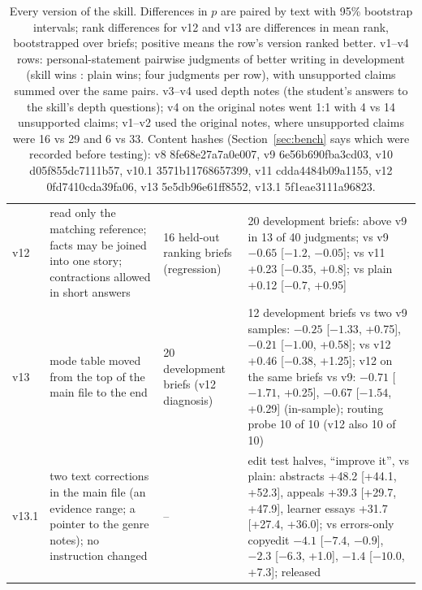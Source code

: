 \documentclass[11pt]{article}
\begin{document}
\begin{table}[t]
\begin{tabular}{lp{4.6cm}p{2.9cm}p{6.4cm}}
v12 & read only the matching reference; facts may be joined into one story; contractions allowed in short answers & 16 held-out ranking briefs (regression) & 20 development briefs: above v9 in 13 of 40 judgments; vs v9 $-0.65$ [$-1.2$, $-0.05$]; vs v11 +0.23 [$-0.35$, +0.8]; vs plain +0.12 [$-0.7$, +0.95] \\
v13 & mode table moved from the top of the main file to the end & 20 development briefs (v12 diagnosis) & 12 development briefs vs two v9 samples: $-0.25$ [$-1.33$, +0.75], $-0.21$ [$-1.00$, +0.58]; vs v12 +0.46 [$-0.38$, +1.25]; v12 on the same briefs vs v9: $-0.71$ [$-1.71$, +0.25], $-0.67$ [$-1.54$, +0.29] (in-sample); routing probe 10 of 10 (v12 also 10 of 10) \\
v13.1 & two text corrections in the main file (an evidence range; a pointer to the genre notes); no instruction changed & -- & edit test halves, ``improve it'', vs plain: abstracts +48.2 [+44.1, +52.3], appeals +39.3 [+29.7, +47.9], learner essays +31.7 [+27.4, +36.0]; vs errors-only copyedit $-4.1$ [$-7.4$, $-0.9$], $-2.3$ [$-6.3$, +1.0], $-1.4$ [$-10.0$, +7.3]; released \\
\bottomrule
\end{tabular}
\caption{Every version of the skill. Differences in $p$ are paired by text with 95\% bootstrap intervals; rank differences for v12 and v13 are differences in mean rank, bootstrapped over briefs; positive means the row's version ranked better. v1--v4 rows: personal-statement pairwise judgments of better writing in development (skill wins : plain wins; four judgments per row), with unsupported claims summed over the same pairs. v3--v4 used depth notes (the student's answers to the skill's depth questions); v4 on the original notes went 1:1 with 4 vs 14 unsupported claims; v1--v2 used the original notes, where unsupported claims were 16 vs 29 and 6 vs 33. Content hashes (Section~\ref{sec:bench} says which were recorded before testing): v8 8fe68e27a7a0e007, v9 6e56b690fba3cd03, v10 d05f855dc7111b57, v10.1 3571b11768657399, v11 cdda4484b09a1155, v12 0fd7410cda39fa06, v13 5e5db96e61ff8552, v13.1 5f1eae3111a96823.}
\label{tab:versions}
\end{table}
\end{document}
